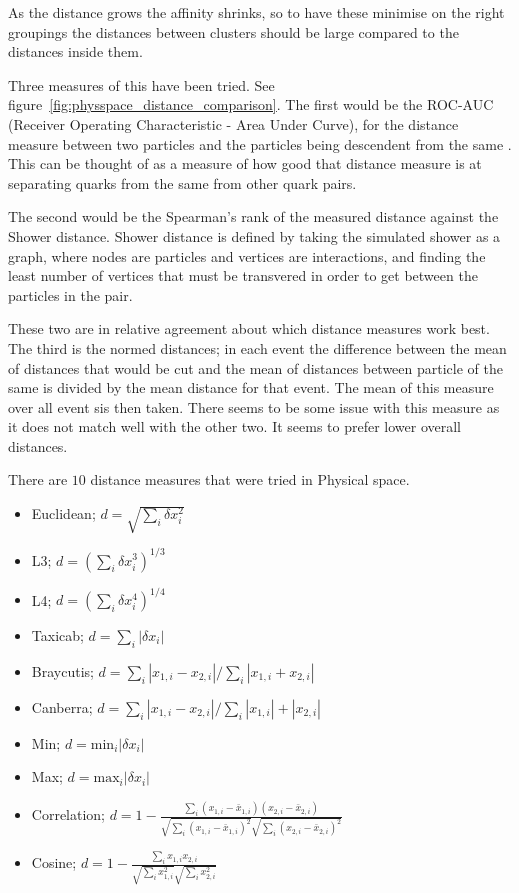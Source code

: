 As the distance grows the affinity shrinks, so to have these minimise on the right groupings
the distances between clusters should be large compared to the distances inside them.


Three measures of this have been tried. See figure~\ref{fig:physspace_distance_comparison}.
The first would be the ROC-AUC (Receiver Operating Characteristic - Area Under Curve),
for the distance measure between two particles and the particles being descendent from the same
.
This can be thought of as a measure of how good that distance measure is at separating 
quarks from the same  from other quark pairs.

The second would be the Spearman's rank of the measured distance against the Shower distance.
Shower distance is defined by taking the simulated shower as a graph, where nodes are particles
and vertices are interactions, and finding the least number of vertices that must be transvered 
in order to get between the particles in the pair.

These two are in relative agreement about which distance measures work best.
The third is the normed distances; in each event the difference between
the mean of distances that would be cut and the mean of distances between particle of the same
 is divided by the mean distance for that event.
The mean of this measure over all event sis then taken.
There seems to be some issue with this measure as it does not match well with the other two.
It seems to prefer lower overall distances.

There are \(10\) distance measures that were tried in Physical space.
\begin{itemize}
    \item Euclidean; \(d = \sqrt{\sum_i \delta x_i^2}\)
    \item L3; \(d = {(\sum_i \delta x_i^3)}^{1/3}\)
    \item L4; \(d = {(\sum_i \delta x_i^4)}^{1/4}\)
    \item Taxicab; \(d = \sum_i |\delta x_i|\)
    \item Braycutis; \(d = \sum_i |x_{1,i} - x_{2,i}|/\sum_i |x_{1,i} + x_{2,i}|\)
    \item Canberra; \(d = \sum_i |x_{1,i} - x_{2,i}|/\sum_i |x_{1,i}| + |x_{2,i}|\)
    \item Min; \(d = \text{min}_i |\delta x_i|\)
    \item Max; \(d = \text{max}_i |\delta x_i|\)
\item Correlation; \(d = 1 - \frac{\sum_i (x_{1,i} - \bar{x}_{1,i})(x_{2,i} - \bar{x}_{2,i})}
                                  {\sqrt{\sum_i (x_{1,i} - \bar{x}_{1,i})^2}\sqrt{\sum_i (x_{2,i} - \bar{x}_{2,i})^2}}\)
\item Cosine; \(d = 1 - \frac{\sum_i x_{1,i}x_{2,i}}
                                  {\sqrt{\sum_i x_{1,i}^2}\sqrt{\sum_i x_{2,i}^2}}\)
\end{itemize}


